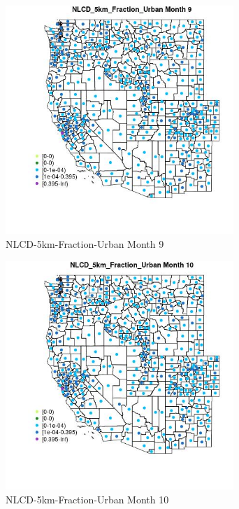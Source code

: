 \begin{figure} 
\centering  
\includegraphics[width=0.77\textwidth]{Code_Outputs/df_report_ML_predictors_CountyCentroid_Locations_Dates_2008-01-01to2018-12-31_MapObsMo9NLCD_5km_Fraction_Urban.jpg} 
\caption{\label{fig:df_report_ML_predictors_CountyCentroid_Locations_Dates_2008-01-01to2018-12-31MapObsMo9NLCD_5km_Fraction_Urban}NLCD-5km-Fraction-Urban Month 9} 
\end{figure} 
 

\begin{figure} 
\centering  
\includegraphics[width=0.77\textwidth]{Code_Outputs/df_report_ML_predictors_CountyCentroid_Locations_Dates_2008-01-01to2018-12-31_MapObsMo10NLCD_5km_Fraction_Urban.jpg} 
\caption{\label{fig:df_report_ML_predictors_CountyCentroid_Locations_Dates_2008-01-01to2018-12-31MapObsMo10NLCD_5km_Fraction_Urban}NLCD-5km-Fraction-Urban Month 10} 
\end{figure} 
 

